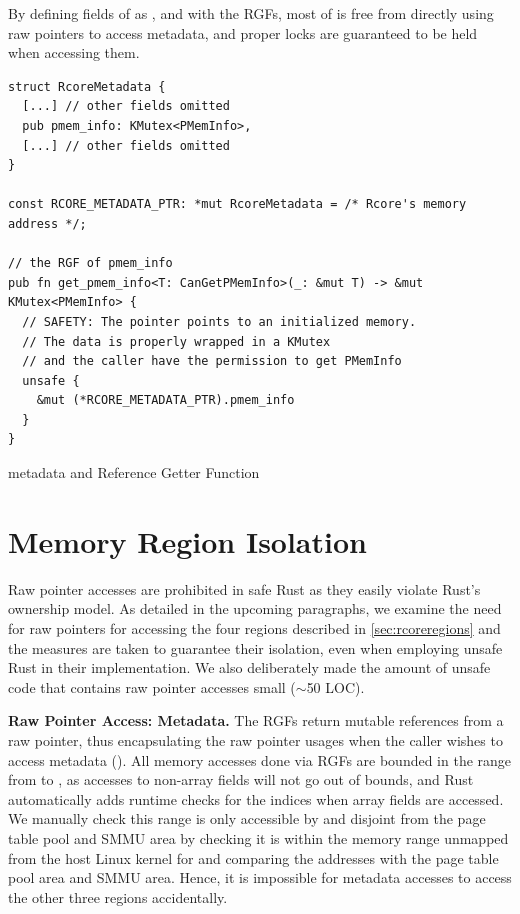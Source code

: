 By defining fields of  as , and with
the RGFs, most of \rustcore{} is free from directly using raw pointers to access
\rustcore{} metadata, and proper locks are guaranteed to be held when accessing
them.

\begin{listing}[ht]
    \begin{verbatim}
struct RcoreMetadata {
  [...] // other fields omitted
  pub pmem_info: KMutex<PMemInfo>,
  [...] // other fields omitted
}

const RCORE_METADATA_PTR: *mut RcoreMetadata = /* Rcore's memory address */;

// the RGF of pmem_info
pub fn get_pmem_info<T: CanGetPMemInfo>(_: &mut T) -> &mut KMutex<PMemInfo> {
  // SAFETY: The pointer points to an initialized memory.
  // The data is properly wrapped in a KMutex
  // and the caller have the permission to get PMemInfo
  unsafe {
    &mut (*RCORE_METADATA_PTR).pmem_info
  }
}
    \end{verbatim}
    \caption{\rustcore{} metadata and Reference Getter Function}
    \label{lst:getternew}
    \vspace{-0.2cm}
\end{listing}

\section{Memory Region Isolation}

Raw pointer accesses are prohibited in safe Rust as they easily violate Rust’s
ownership model. As detailed in the upcoming paragraphs, we examine the need
for raw pointers for accessing the four regions described in \autoref{sec:rcoreregions}
and the measures are taken to guarantee their isolation,
even when employing unsafe Rust in their implementation.
We also deliberately made the
amount of unsafe code that contains raw pointer accesses small ($\sim$50 LOC).

\textbf{Raw Pointer Access: \rustcore{} Metadata.}
The RGFs return mutable references from a raw pointer, thus encapsulating the
raw pointer usages when the caller wishes to access \rustcore{} metadata
().
All memory accesses done via RGFs are bounded in the range
from  to
,
as accesses to non-array fields will not go out of bounds,
and Rust automatically adds runtime checks for the indices when array fields are accessed.
We manually check this range is only accessible by \rustcore{} and disjoint
from the page table pool and SMMU area by checking it is within the memory range unmapped from the
host Linux kernel for \rustcore{} and comparing the addresses with the page table pool area and SMMU area.
Hence, it is impossible for \rustcore{} metadata accesses to access
the other three regions accidentally.

